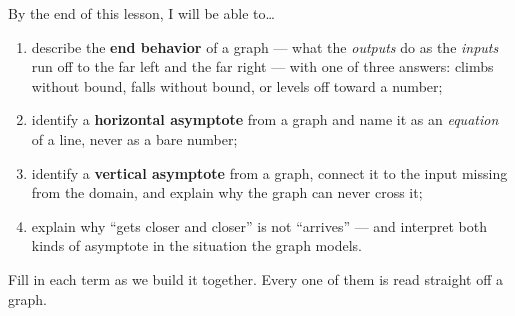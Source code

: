 \documentclass[10pt]{article}
\begin{document}

\vspace{0.15in}

\begin{objectivebox}
\small
By the end of this lesson, I will be able to\dots
\begin{enumerate}[leftmargin=1.5em, itemsep=2pt, topsep=3pt]
  \item describe the \textbf{end behavior} of a graph --- what the \emph{outputs} do as the
        \emph{inputs} run off to the far left and the far right --- with one of three answers: climbs
        without bound, falls without bound, or levels off toward a number;
  \item identify a \textbf{horizontal asymptote} from a graph and name it as an \emph{equation} of a
        line, never as a bare number;
  \item identify a \textbf{vertical asymptote} from a graph, connect it to the input missing from the
        domain, and explain why the graph can never cross it;
  \item explain why ``gets closer and closer'' is not ``arrives'' --- and interpret both kinds of
        asymptote in the situation the graph models.
\end{enumerate}
\end{objectivebox}

\vspace{0.10in}

\boxguard
\begin{vocabbox}
\small
Fill in each term as we build it together. Every one of them is read straight off a graph.
\end{vocabbox}

\vspace{0.10in}
\end{document}
